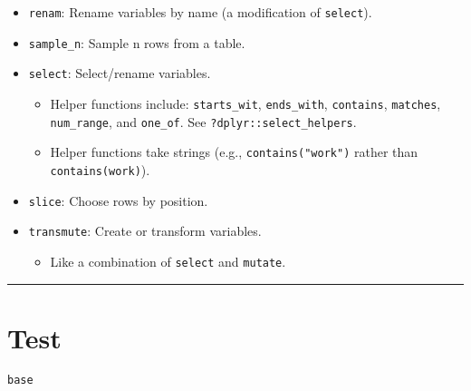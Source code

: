 \documentclass[]{book}
\providecommand{\tightlist}{%
  \setlength{\itemsep}{0pt}\setlength{\parskip}{0pt}}
\begin{document}
\begin{itemize}
\tightlist
\item
  \texttt{renam}: Rename variables by name (a modification of \texttt{select}).
\item
  \texttt{sample\_n}: Sample n rows from a table.
\item
  \texttt{select}: Select/rename variables.

  \begin{itemize}
  \tightlist
  \item
    Helper functions include: \texttt{starts\_wit}, \texttt{ends\_with}, \texttt{contains}, \texttt{matches}, \texttt{num\_range}, and \texttt{one\_of}. See \texttt{?dplyr::select\_helpers}.
  \item
    Helper functions take strings (e.g., \texttt{contains("work")} rather than \texttt{contains(work)}).
  \end{itemize}
\item
  \texttt{slice}: Choose rows by position.
\item
  \texttt{transmute}: Create or transform variables.

  \begin{itemize}
  \tightlist
  \item
    Like a combination of \texttt{select} and \texttt{mutate}.
  \end{itemize}
\end{itemize}

\begin{center}\rule{0.5\linewidth}{\linethickness}\end{center}

\hypertarget{test}{%
\section{Test}\label{test}}

\texttt{base}
\end{document}
